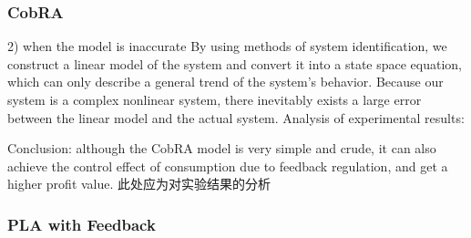 \documentclass[sigconf]{acmart}
\begin{document}
\subsubsection{CobRA}
2) when the model is inaccurate
By using methods of system identification, we construct a linear model of the system and convert it into a state space equation, which can only describe a general trend of the system's behavior. Because our system is a complex nonlinear system, there inevitably exists a large error between the linear model and the actual system.
Analysis of experimental results:

Conclusion: although the CobRA model is very simple and crude, it can also achieve the control effect of consumption due to feedback regulation, and get a higher profit value.
此处应为对实验结果的分析
\subsubsection{PLA with Feedback}
\end{document}
